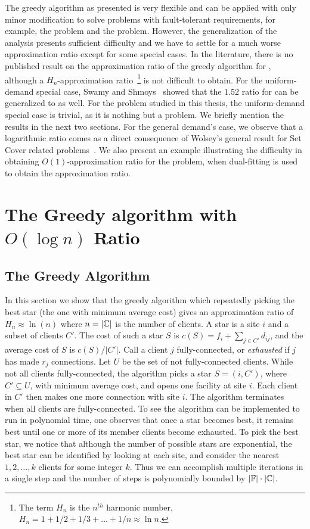 \documentclass[oneside,final]{ucr}
\begin{document}
The greedy algorithm as presented is very flexible and can
be applied with only minor modification to solve problems
with fault-tolerant requirements, for example, the {\FTFL}
problem and the {\FTFP} problem. However, the generalization
of the analysis presents sufficient difficulty and we have
to settle for a much worse approximation ratio except for
some special cases. In the literature, there is no published
result on the approximation ratio of the greedy algorithm
for {\FTFL}, although a $H_n$-approximation
ratio~\footnote{The term $H_n$ is the $n^{th}$ harmonic
  number, $H_n = 1 + 1/2 + 1/3 + \ldots + 1/n \approx \ln
  n$.} is not difficult to obtain. For the uniform-demand
special case, Swamy and Shmoys~\cite{SwamyS08} showed that
the $1.52$ ratio for {\UFL} can be generalized to {\FTFL} as
well. For the {\FTFP} problem studied in this thesis, the
uniform-demand special case is trivial, as it is nothing but
a {\UFL} problem. We briefly mention the results in the next
two sections. For the general demand's case, we observe that
a logarithmic ratio comes as a direct consequence of
Wolsey's general result for Set Cover related
problems~\cite{Wolsey88}. We also present an example
illustrating the difficulty in obtaining
$O(1)$-approximation ratio for the {\FTFP} problem, when
dual-fitting is used to obtain the approximation ratio.

\section{The Greedy algorithm with $O(\log n)$ Ratio}
\label{sec: greedy_ratio}

\subsection{The Greedy Algorithm}
In this section we show that the greedy algorithm which
repeatedly picking the best star (the one with minimum
average cost) gives an approximation ratio of $H_n \approx
\ln(n)$ where $n=|\mathbb{C}|$ is the number of clients. A
star is a site $i$ and a subset of clients $C'$. The cost of
such a star $S$ is $c(S) = f_i + \sum_{j\in C'} d_{ij}$, and
the average cost of $S$ is $c(S) / |C'|$. Call a client $j$
fully-connected, or \emph{exhausted} if $j$ has made $r_j$
connections. Let $U$ be the set of not fully-connected
clients. While not all clients fully-connected, the
algorithm picks a star $S=(i,C')$, where $C' \subseteq U$,
with minimum average cost, and opens one facility at site
$i$. Each client in $C'$ then makes one more connection with
site $i$. The algorithm terminates when all clients are
fully-connected. To see the algorithm can be implemented to
run in polynomial time, one observes that once a star
becomes best, it remains best until one or more of its
member clients become exhausted. To pick the best star, we
notice that although the number of possible stars are
exponential, the best star can be identified by looking at
each site, and consider the nearest $1,2,\ldots,k$ clients
for some integer $k$. Thus we can accomplish multiple
iterations in a single step and the number of steps is
polynomially bounded by $|\mathbb{F}|\cdot|\mathbb{C}|$.
\end{document}
